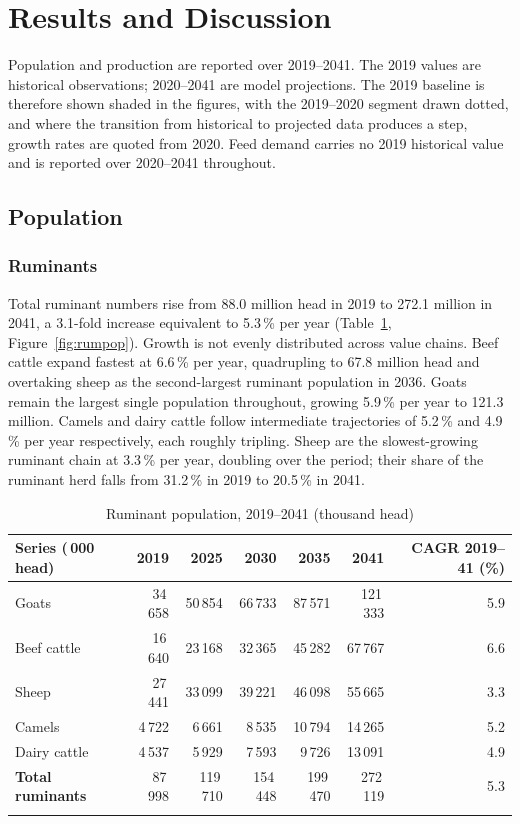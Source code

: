\section{Results and Discussion}

Population and production are reported over 2019--2041. The 2019 values are
historical observations; 2020--2041 are model projections. The 2019 baseline is
therefore shown shaded in the figures, with the 2019--2020 segment drawn dotted,
and where the transition from historical to projected data produces a step,
growth rates are quoted from 2020. Feed demand carries no 2019
historical value and is reported over 2020--2041 throughout. 

\subsection{Population}

\subsubsection{Ruminants}

Total ruminant numbers rise from 88.0 million head in 2019 to 272.1 million in
2041, a 3.1-fold increase equivalent to 5.3\,\% per year (Table~\ref{tab:rumpop},
Figure~\ref{fig:rumpop}). Growth is not evenly distributed across value chains. Beef cattle expand
fastest at 6.6\,\% per year, quadrupling to 67.8 million head and overtaking
sheep as the second-largest ruminant population in 2036. Goats remain the
largest single population throughout, growing 5.9\,\% per year to 121.3 million.
Camels and dairy cattle follow intermediate trajectories of 5.2\,\% and
4.9\,\% per year respectively, each roughly tripling. Sheep are the
slowest-growing ruminant chain at 3.3\,\% per year, doubling over the period;
their share of the ruminant herd falls from 31.2\,\% in 2019 to
20.5\,\% in 2041.

\begin{table}[htbp]
\centering
\caption{Ruminant population, 2019--2041 (thousand head)}
\label{tab:rumpop}
\small
\begin{tabular}{lrrrrrr}
\toprule
\textbf{Series} (\,000 head) & \textbf{2019} & \textbf{2025} & \textbf{2030} & \textbf{2035} & \textbf{2041} & \textbf{CAGR 2019--41 (\%)} \\
\midrule
Goats & 34\,658 & 50\,854 & 66\,733 & 87\,571 & 121\,333 & 5.9 \\
Beef cattle & 16\,640 & 23\,168 & 32\,365 & 45\,282 & 67\,767 & 6.6 \\
Sheep & 27\,441 & 33\,099 & 39\,221 & 46\,098 & 55\,665 & 3.3 \\
Camels & 4\,722 & 6\,661 & 8\,535 & 10\,794 & 14\,265 & 5.2 \\
Dairy cattle & 4\,537 & 5\,929 & 7\,593 & 9\,726 & 13\,091 & 4.9 \\
\textbf{Total ruminants} & 87\,998 & 119\,710 & 154\,448 & 199\,470 & 272\,119 & 5.3 \\
\botrule
\end{tabular}
\end{table}

